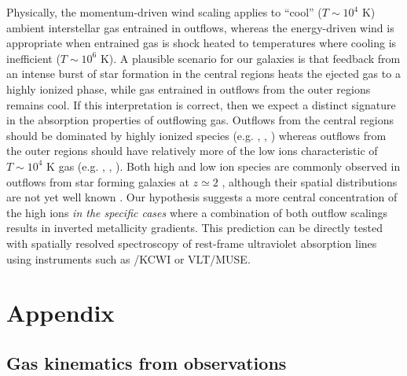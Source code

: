 Physically, the momentum-driven wind scaling applies to ``cool'' ($T \sim 10^4$ K) ambient interstellar gas entrained in outflows,
whereas the energy-driven wind is appropriate when entrained gas is shock heated to temperatures where cooling is inefficient ($T
\sim 10^6$ K). A plausible scenario for our galaxies is that feedback from an intense burst of star formation in the central
regions heats the ejected gas to a highly ionized phase, while gas entrained in outflows from the outer regions remains cool. If
this interpretation is correct, then we expect a distinct signature in the absorption properties of outflowing gas. Outflows from
the central regions should be dominated by highly ionized species (e.g. , , ) whereas
outflows from the outer regions should have relatively more of the low ions characteristic of $T \sim 10^4$ K gas (e.g.
, , ). Both high and low ion species are commonly observed in outflows from star forming
galaxies at $z\simeq2$ \citep{Berg:2018gd,Du:2018tr}, although their spatial distributions are not yet well known 
\citep[but see][]{James:2018km}.
Our hypothesis suggests a more central concentration of the high ions \emph{in the specific cases} where a 
combination of both outflow scalings results in inverted metallicity gradients.
This prediction can be directly tested with spatially resolved spectroscopy of rest-frame
ultraviolet absorption lines using instruments such as \keck/KCWI or VLT/MUSE.


\renewcommand{\thesection}{\thechapter.A}
\section{Appendix}

\renewcommand{\thesubsection}{\thechapter.A.\arabic{subsection}}
\subsection{Gas kinematics from \keck \osiris observations}\label{sect:kinem}


